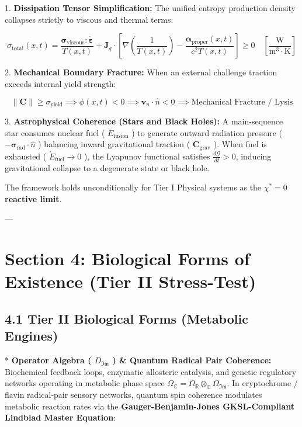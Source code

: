 \documentclass[11pt,a4paper]{article}
\theoremstyle{definition}
\theoremstyle{remark}
\begin{document}
1. \textbf{Dissipation Tensor Simplification:}
The unified entropy production density collapses strictly to viscous and thermal terms:


\begin{equation}
\sigma_{\text{total}}(x, t) = \frac{\boldsymbol{\sigma}_{\text{viscous}} : \dot{\boldsymbol{\varepsilon}}}{T(x, t)} + \mathbf{J}_q \cdot [ \nabla\left(\frac{1}{T(x, t)}\right) - \frac{\boldsymbol{\alpha}_{\text{proper}}(x, t)}{c^2 T(x, t)} ] \ge 0 \quad [\frac{\mathrm{W}}{\mathrm{m^3 \cdot K}}]
\end{equation}


2. \textbf{Mechanical Boundary Fracture:}
When an external challenge traction exceeds internal yield strength:


\begin{equation}
\|\mathbf{C}\| \ge \sigma_{\text{yield}} \implies \phi(x, t) < 0 \implies \mathbf{v}_n \cdot \hat{n} < 0 \implies \text{Mechanical Fracture / Lysis}
\end{equation}


3. \textbf{Astrophysical Coherence (Stars and Black Holes):}
A main-sequence star consumes nuclear fuel ( $\dot{E}_{\text{fusion}}$ ) to generate outward radiation pressure ( $-\boldsymbol{\sigma}_{\text{rad}}\cdot\hat{n}$ ) balancing inward gravitational traction ( $\mathbf{C}_{\text{grav}}$ ). When fuel is exhausted ( $\dot{E}_{\text{fuel}} \to 0$ ), the Lyapunov functional satisfies $\frac{d\mathcal{G}}{dt} > 0$, inducing gravitational collapse to a degenerate state or black hole.

The framework holds unconditionally for Tier I Physical systems as the \textbf{$\chi^* = 0$ reactive limit}.

---

\section{Section 4: Biological Forms of Existence (Tier II Stress-Test)}

\subsection{4.1 Tier II Biological Forms (Metabolic Engines)}
* \textbf{Operator Algebra ( $D_{\mathfrak{Im}}$ ) \& Quantum Radical Pair Coherence:}
Biochemical feedback loops, enzymatic allosteric catalysis, and genetic regulatory networks operating in metabolic phase space $\Omega_{\mathbb{C}} = \Omega_{\mathbb{R}} \otimes_{\mathbb{C}} \Omega_{\mathfrak{Im}}$. In cryptochrome / flavin radical-pair sensory networks, quantum spin coherence modulates metabolic reaction rates via the \textbf{Gauger-Benjamin-Jones GKSL-Compliant Lindblad Master Equation}:
\end{document}
